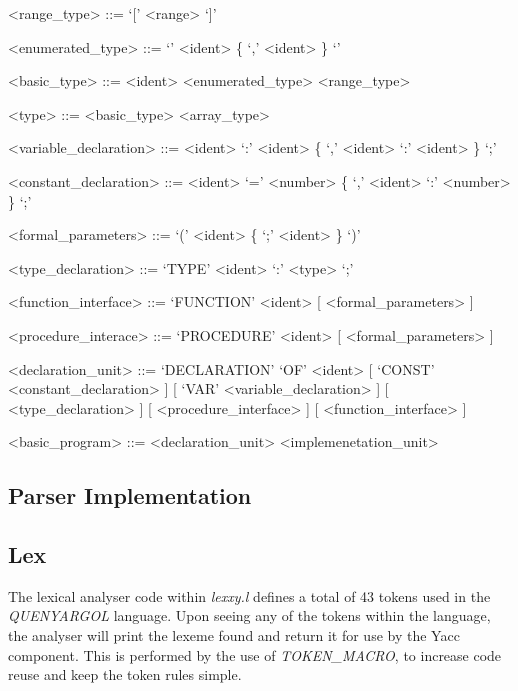 \documentclass[]{article}
\begin{document}
\begin{grammar}
	<range_type> ::= `[' <range> `]'
	
	<enumerated_type> ::= `{' <ident> \{ `,' <ident> \} `}'
	
	<basic_type> ::= <ident> 
	\alt <enumerated_type>
	\alt <range_type>
	
	<type> ::= <basic_type>
	\alt <array_type>
	
	<variable_declaration> ::= <ident> `:' <ident> \{ `,' <ident> `:' <ident> \} `;'
	
	<constant_declaration> ::= <ident> `=' <number> \{ `,' <ident> `:' <number> \} `;'
	
	<formal_parameters> ::= `(' <ident> \{ `;' <ident> \} `)'
	
	<type_declaration> ::= `TYPE' <ident> `:' <type> `;'
	
	<function_interface> ::= `FUNCTION' <ident> [ <formal_parameters> ]
	
	<procedure_interace> ::= `PROCEDURE' <ident> [ <formal_parameters> ]
	
	<declaration_unit> ::= `DECLARATION' `OF' <ident>
    [ `CONST' <constant_declaration> ]
	[ `VAR' <variable_declaration> ]
	[ <type_declaration> ]
	[ <procedure_interface> ]
	[ <function_interface> ]
	
	<basic_program> ::= <declaration_unit> <implemenetation_unit>
	
\end{grammar}
\vspace{0.5cm}


\newpage
\begin{center}
	\section*{Parser Implementation}
\end{center}
\vspace{1cm}

\subsection*{Lex}
\vspace{0.5cm}

The lexical analyser code within \textit{lexxy.l} defines a total of 43 tokens used in the \textit{QUENYARGOL} language. Upon seeing any of the tokens within the language, the analyser will print the lexeme found and return it for use by the Yacc component. This is performed by the use of \textit{TOKEN_MACRO}, to increase code reuse and keep the token rules simple.\\
\end{document}
